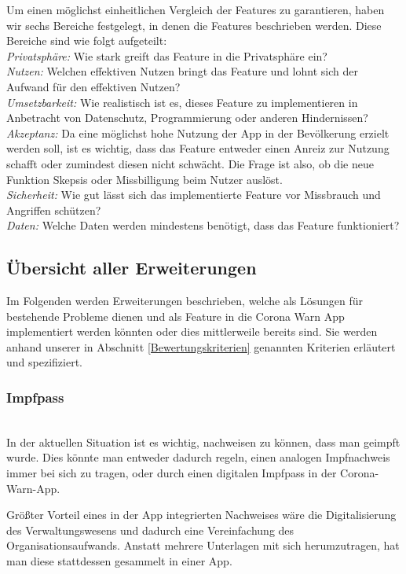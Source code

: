\documentclass[conference,compsoc]{IEEEtran}
\begin{document}
Um einen möglichst einheitlichen Vergleich der Features zu garantieren, haben wir sechs Bereiche festgelegt, in denen die Features beschrieben werden.
Diese Bereiche sind wie folgt aufgeteilt:\\
\textit{Privatsphäre:} Wie stark greift das Feature in die Privatsphäre ein?\\
\textit{Nutzen:} Welchen effektiven Nutzen bringt das Feature und lohnt sich der Aufwand für den effektiven Nutzen?\\
\textit{Umsetzbarkeit:} Wie realistisch ist es, dieses Feature zu implementieren in Anbetracht von Datenschutz, Programmierung oder anderen Hindernissen?\\
\textit{Akzeptanz:} Da eine möglichst hohe Nutzung der App in der Bevölkerung erzielt werden soll, ist es wichtig, dass das Feature entweder einen Anreiz zur Nutzung schafft oder zumindest diesen nicht schwächt. 
Die Frage ist also, ob die neue Funktion Skepsis oder Missbilligung beim Nutzer auslöst.\\
\textit{Sicherheit:} Wie gut lässt sich das implementierte Feature vor Missbrauch und Angriffen schützen?\\
\textit{Daten:} Welche Daten werden mindestens benötigt, dass das Feature funktioniert?\\


\subsection{Übersicht aller Erweiterungen}

Im Folgenden werden Erweiterungen beschrieben, welche als Lösungen für bestehende Probleme dienen und als Feature in die Corona Warn App implementiert werden könnten oder 
dies mittlerweile bereits sind. Sie werden anhand unserer in Abschnitt \ref{Bewertungskriterien} genannten Kriterien erläutert und spezifiziert.\\

\subsubsection{Impfpass}
\text{}\\
In der aktuellen Situation ist es wichtig, nachweisen zu können, dass man geimpft wurde. 
Dies könnte man entweder dadurch regeln, einen analogen Impfnachweis immer bei sich zu tragen, oder durch einen digitalen Impfpass in der Corona-Warn-App.

Größter Vorteil eines in der App integrierten Nachweises wäre die Digitalisierung des Verwaltungswesens und dadurch eine Vereinfachung des Organisationsaufwands. 
Anstatt mehrere Unterlagen mit sich herumzutragen, hat man diese stattdessen gesammelt in einer App.
\end{document}
